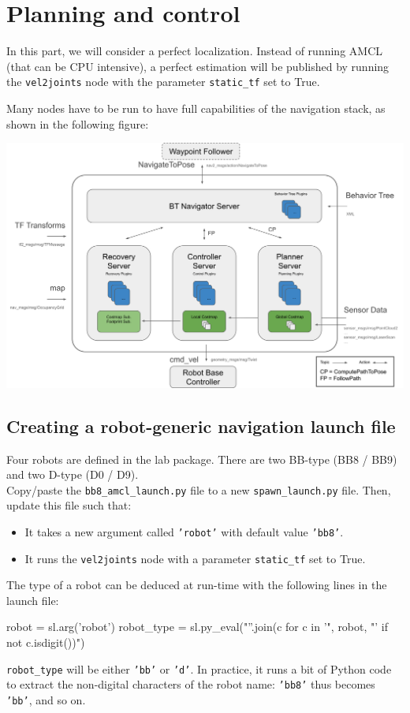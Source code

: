 \documentclass{ecnreport}
\begin{document}
\section{Planning and control}

In this part, we will consider a perfect localization. Instead of running AMCL (that can be CPU intensive), a perfect estimation 
will be published by running the \texttt{vel2joints} node with the parameter \texttt{static\_tf} set to True.

Many nodes have to be run to have full capabilities of the navigation stack, as shown in the following figure:
\begin{center}
 \includegraphics[width=.7\linewidth]{nav2_architectural_diagram}
\end{center}

\subsection{Creating a robot-generic navigation launch file}

Four robots are defined in the lab package. There are two BB-type (BB8 / BB9) and two D-type (D0 / D9).\\

Copy/paste the \texttt{bb8\_amcl\_launch.py} file to a new \texttt{spawn\_launch.py} file. Then, update this file such that:
\begin{itemize}
 \item It takes a new argument called \texttt{'robot'} with default value \texttt{'bb8'}.
 \item It runs the \texttt{vel2joints} node with a parameter \texttt{static\_tf} set to True. 
\end{itemize}

The type of a robot can be deduced at run-time with the following lines in the launch file:
\begin{pythoncodelarge}
robot = sl.arg('robot')
robot_type = sl.py_eval("''.join(c for c in '", robot, "' if not c.isdigit())") 
\end{pythoncodelarge}\texttt{robot\_type} will be either \texttt{'bb'} or \texttt{'d'}. In practice, it runs a bit of Python code to extract the non-digital characters of the robot name: \texttt{'bb8'} thus becomes \texttt{'bb'}, and so on.\\
\end{document}
